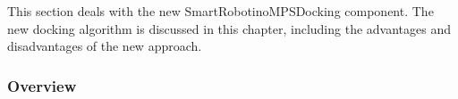 This section deals with the new SmartRobotinoMPSDocking component. The new docking algorithm is discussed in this chapter, including the advantages and disadvantages of the new approach.

\subsubsection{Overview}
